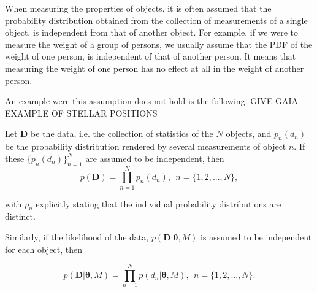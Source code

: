 When measuring the properties of objects, it is often assumed that the probability distribution obtained from the collection of measurements of a single object, is independent from that of another object. For example, if we were to measure the weight of a group of persons, we usually assume that the PDF of the weight of one person, is independent of that of another person. It means that measuring the weight of one person has no effect at all in the weight of another person.

{\color{red}
An example were this assumption does not hold is the following. GIVE GAIA EXAMPLE OF STELLAR POSITIONS
}

Let $\mathbf{D}$ be the data, i.e. the collection of statistics of the $N$ objects, and $p_n(d_n)$ be the probability distribution rendered by several measurements of object $n$. If these $\{p_n(d_n)\}_{n=1}^N$ are assumed to be independent, then
\begin{equation}
\label{eq:independence}
 p(\mathbf{D}) = \prod_{n=1}^N p_n(d_n), \ \ n=\{1,2,...,N\},
\end{equation}

 with $p_n$ explicitly stating that the individual probability distributions are distinct. 
 
Similarly, if the likelihood of the data, $p(\mathbf{D}|\mathbf{\theta},M)$ is assumed to be independent for each object, then

\begin{equation}
\label{eq:lik_datum}
 p(\mathbf{D}|\mathbf{\theta},M) = \prod_{n=1}^N p(d_n|\mathbf{\theta},M), \ \ n=\{1,2,...,N\}.
\end{equation}

